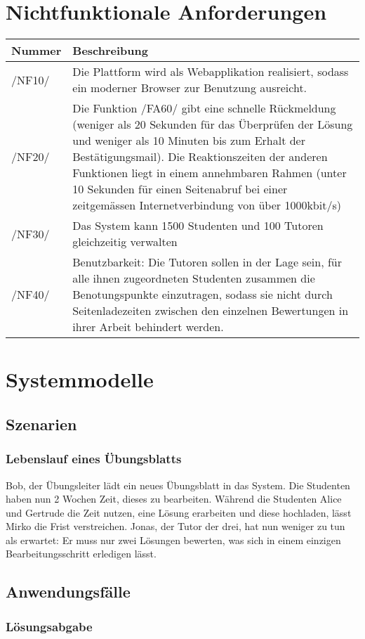 \documentclass[a4paper,10pt]{article}
\newcommand\addrow[2]{#1 &#2\\ }
\newcommand\addheading[2]{#1 &#2\\ \hline}
\newcommand\tabularhead{\begin{tabular}{lp{13cm}}
\hline
}
\newenvironment{usecase}{\tabularhead}
{\hline\end{tabular}}
\begin{document}
\section{Nichtfunktionale Anforderungen}
\begin{usecase}

\addheading{Nummer}{Beschreibung}
\addrow{/NF10/} {Die Plattform wird als Webapplikation realisiert, sodass ein moderner Browser zur Benutzung ausreicht.}
\addrow{/NF20/} {Die Funktion /FA60/ gibt eine schnelle Rückmeldung (weniger als 20 Sekunden für das Überprüfen der Lösung und weniger als 10 Minuten bis zum Erhalt der Bestätigungsmail). Die Reaktionszeiten der anderen Funktionen liegt in einem annehmbaren Rahmen (unter 10 Sekunden für einen Seitenabruf bei einer zeitgemässen Internetverbindung von über 1000kbit/s)}
\addrow{/NF30/} {Das System kann 1500 Studenten und 100 Tutoren gleichzeitig verwalten}
\addrow{/NF40/} {Benutzbarkeit: Die Tutoren sollen in der Lage sein, für alle ihnen zugeordneten Studenten zusammen die Benotungspunkte einzutragen, sodass sie nicht durch Seitenladezeiten zwischen den einzelnen Bewertungen in ihrer Arbeit behindert werden.}

\end{usecase}

\section{Systemmodelle}
\subsection{Szenarien}
\subsubsection{Lebenslauf eines Übungsblatts}

Bob, der Übungsleiter lädt ein neues Übungsblatt in das System. Die Studenten haben nun 2 Wochen Zeit, dieses zu bearbeiten. Während die Studenten Alice und Gertrude die Zeit nutzen, eine Lösung erarbeiten und diese hochladen, lässt Mirko die Frist verstreichen. Jonas, der Tutor der drei, hat nun weniger zu tun als erwartet: Er muss nur zwei Lösungen bewerten, was sich in einem einzigen Bearbeitungsschritt erledigen lässt.

\subsection{Anwendungsfälle}
\subsubsection{Lösungsabgabe}
\end{document}
